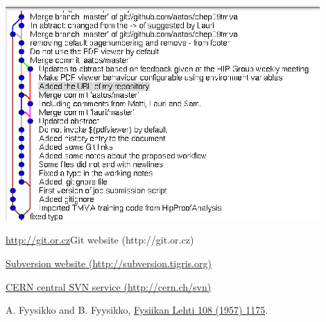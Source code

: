 \documentclass[12pt]{article}
\begin{document}
\includegraphics[width=12cm]{history.eps}


\begin{thebibliography}{9}

\url{http://git.or.cz}{Git website (http://git.or.cz)}

\href{http://subversion.tigris.org}{Subversion website (http://subversion.tigris.org)}

\href{http://cern.ch/svn}{CERN central SVN service (http://cern.ch/svn)}

A. Fyysikko and B. Fyysikko,
\href{http://link.aps.org/abstract/PR/v108/p1175}{Fysiikan Lehti 108
(1957) 1175}.
\end{thebibliography}
\end{document}
